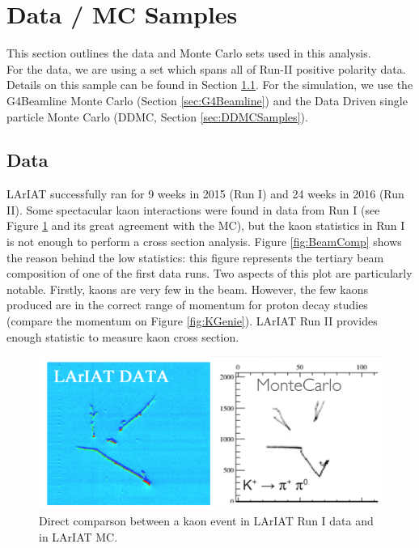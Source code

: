 \section{Data / MC Samples}\label{sec:DataSamples}

This section outlines the data and Monte Carlo sets used in this analysis. \\
For the data, we are using a set which spans all of Run-II positive polarity data. Details on this sample can be found in Section \ref{sec:data}. For the simulation, we use the G4Beamline Monte Carlo (Section \ref{sec:G4Beamline}) and the Data Driven single particle Monte Carlo (DDMC, Section \ref{sec:DDMCSamples}). 


\subsection{Data}\label{sec:data}



LArIAT successfully ran for 9 weeks in 2015 (Run I) and 24 weeks in 2016 (Run II). Some spectacular kaon interactions were found in data from Run I (see Figure \ref{fig:MCdata} and its great agreement with the MC),
but the kaon statistics in Run I is not enough to perform a cross section analysis. Figure \ref{fig:BeamComp} shows the reason behind the low statistics: this figure represents the tertiary beam composition of one of the first data runs. Two aspects of this plot are particularly notable. Firstly, kaons are very few in the beam. However, the few kaons produced are in the correct range of momentum for proton decay studies (compare the momentum on Figure \ref{fig:KGenie}).  LArIAT Run II provides enough statistic to measure kaon cross section. 
\begin{figure}[hpbt]
\centering
\includegraphics[width=6in]{images/Lariat/KDataMC}
\caption{Direct comparson between a kaon event in LArIAT Run I data and in LArIAT MC. }
\label{fig:MCdata}
\end{figure}


